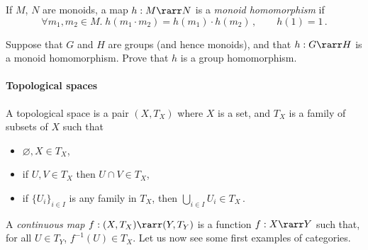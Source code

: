 \documentclass[12pt]{article}
\begin{document}
If $M$, $N$ are monoids, a map $h:M\rarr N$ is a \emph{monoid homomorphism} if
\[ \forall m_1,m_2\in M.\;h(m_1\cdot m_2) = h(m_1)\cdot h(m_2)\,, \qquad h(1) = 1\,.  \]

\begin{myexercise}
\label{monhom}
Suppose that $G$ and $H$ are groups (and hence monoids), and that $h : G \rarr H$ is a monoid homomorphism. Prove that $h$ is a group homomorphism.
\end{myexercise}

\paragraph{Topological spaces}
A topological space is a pair $(X, T_{X})$ where $X$ is a set, and $T_{X}$ is a family of subsets of $X$ such that
\begin{itemize}
  \item $\varnothing,X \in T_{X}$,
  \item if $U, V \in T_{X}$ then $U \cap V \in T_{X}$,
  \item if $\{ U_{i} \}_{i \in I}$ is any family in $T_{X}$, then $\bigcup_{i \in I} U_{i} \in T_{X}$\,.
\end{itemize}
A \emph{continuous map} $f : (X, T_{X}) \rarr (Y, T_{Y})$ is a function $f : X \rarr Y$ such that, for all $U \in T_{Y}$, $f^{-1}(U) \in T_{X}$.
Let us now see some first examples of  categories.
\end{document}
